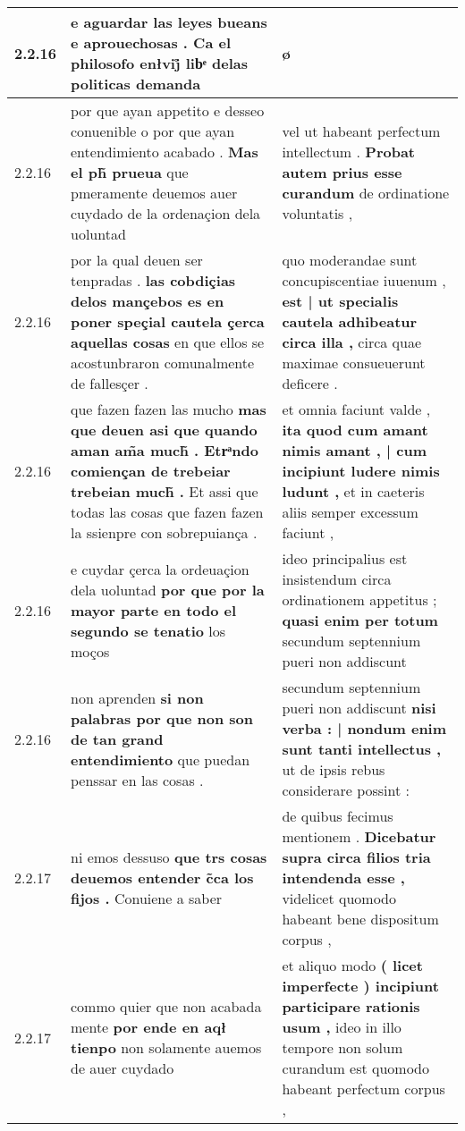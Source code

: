 \begin{tabular}{|p{1cm}|p{6.5cm}|p{6.5cm}|}
2.2.16 & e aguardar las leyes bueans e aprouechosas . \textbf{ Ca el philosofo enłvij̊ libͤ delas politicas } demanda & ø \\\hline
2.2.16 & por que ayan appetito e desseo conuenible o por que ayan entendimiento acabado . \textbf{ Mas el ph̃ prueua } que pmeramente deuemos auer cuydado de la ordenaçion dela uoluntad & vel ut habeant perfectum intellectum . \textbf{ Probat autem prius esse curandum } de ordinatione voluntatis , \\\hline
2.2.16 & por la qual deuen ser tenpradas . \textbf{ las cobdiçias delos mançebos es en poner speçial cautela çerca aquellas cosas } en que ellos se acostunbraron comunalmente de fallesçer . & quo moderandae sunt concupiscentiae iuuenum , \textbf{ est | ut specialis cautela adhibeatur circa illa , } circa quae maximae consueuerunt deficere . \\\hline
2.2.16 & que fazen fazen las mucho \textbf{ mas que deuen asi que quando aman am̃a much̃ . Etrͣndo comiençan de trebeiar trebeian much̃ . } Et assi que todas las cosas que fazen fazen la ssienpre con sobrepuiança . & et omnia faciunt valde , \textbf{ ita quod cum amant nimis amant , | cum incipiunt ludere nimis ludunt , } et in caeteris aliis semper excessum faciunt , \\\hline
2.2.16 & e cuydar çerca la ordeuaçion dela uoluntad \textbf{ por que por la mayor parte en todo el segundo se tenatio } los moços & ideo principalius est insistendum circa ordinationem appetitus ; \textbf{ quasi enim per totum } secundum septennium pueri non addiscunt \\\hline
2.2.16 & non aprenden \textbf{ si non palabras por que non son de tan grand entendimiento } que puedan penssar en las cosas . & secundum septennium pueri non addiscunt \textbf{ nisi verba : | nondum enim sunt tanti intellectus , } ut de ipsis rebus considerare possint : \\\hline
2.2.17 & ni emos dessuso \textbf{ que trs cosas deuemos entender c̃ca los fijos . } Conuiene a saber & de quibus fecimus mentionem . \textbf{ Dicebatur supra circa filios tria intendenda esse , } videlicet quomodo habeant bene dispositum corpus , \\\hline
2.2.17 & commo quier que non acabada mente \textbf{ por ende en aqł tienpo } non solamente auemos de auer cuydado & et aliquo modo \textbf{ ( licet imperfecte ) incipiunt participare rationis usum , } ideo in illo tempore non solum curandum est quomodo habeant perfectum corpus , \\\hline

\end{tabular}
